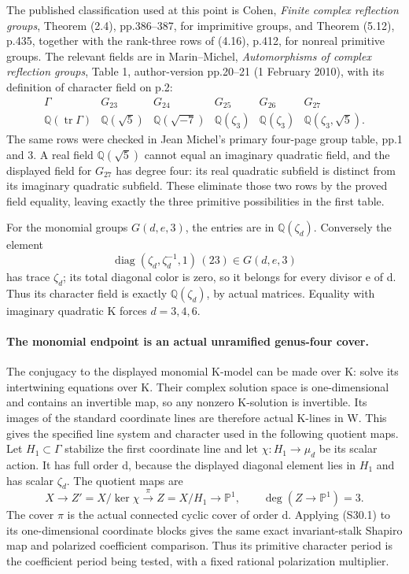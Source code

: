 The published classification used at this point is Cohen,
\emph{Finite complex reflection groups}, Theorem (2.4), pp.386--387,
for imprimitive groups, and Theorem (5.12), p.435, together with
the rank-three rows of (4.16), p.412, for nonreal primitive groups.
The relevant fields are in Marin--Michel, \emph{Automorphisms of
complex reflection groups}, Table 1, author-version pp.20--21
(1 February 2010), with its definition of character field on p.2:
\[
\begin{array}{c|ccccc}
\Gamma&G_{23}&G_{24}&G_{25}&G_{26}&G_{27}\\\hline
\mathbb Q(\operatorname{tr}\Gamma)&\mathbb Q(\sqrt5)&
\mathbb Q(\sqrt{-7})&\mathbb Q(\zeta_3)&
\mathbb Q(\zeta_3)&\mathbb Q(\zeta_3,\sqrt5).
\end{array}
\]
The same rows were checked in Jean Michel's primary four-page group
table, pp.1 and 3. A real field \(\mathbb Q(\sqrt5)\) cannot
equal an imaginary quadratic field, and the displayed field for
\(G_{27}\) has degree four: its real quadratic subfield is
distinct from its imaginary quadratic subfield. These eliminate
those two rows by the proved field equality, leaving exactly the
three primitive possibilities in the first table.

For the monomial groups \(G(d,e,3)\), the entries are in
\(\mathbb Q(\zeta_d)\). Conversely the element
\[
 \operatorname{diag}(\zeta_d,\zeta_d^{-1},1)\,(23)
                  \in G(d,e,3)
\]
has trace \(\zeta_d\); its total diagonal color is zero, so
it belongs for every divisor e of d. Thus its character field is
exactly \(\mathbb Q(\zeta_d)\), by actual matrices.
Equality with imaginary quadratic K forces \(d=3,4,6\).

\paragraph{The monomial endpoint is an actual unramified genus-four cover.}
The conjugacy to the displayed monomial K-model can be made over K:
solve its intertwining equations over K. Their complex solution space
is one-dimensional and contains an invertible map, so any nonzero
K-solution is invertible. Its images of the standard coordinate lines
are therefore actual K-lines in W. This gives the specified line
system and character used in the following quotient maps.
Let \(H_1\subset\Gamma\) stabilize the first coordinate line
and let \(\chi:H_1\to\mu_d\) be its scalar action. It has
full order d, because the displayed diagonal element lies in
\(H_1\) and has scalar \(\zeta_d\). The quotient maps are
\[
 X\longrightarrow Z'=X/\ker\chi
       \xrightarrow{\pi}Z=X/H_1\longrightarrow\mathbb P^1,
 \qquad \deg(Z\to\mathbb P^1)=3.
\]
The cover \(\pi\) is the actual connected cyclic cover of order
d. Applying (S30.1) to its one-dimensional coordinate blocks gives
the same exact invariant-stalk Shapiro map and polarized coefficient
comparison. Thus its primitive character period is the coefficient
period being tested, with a fixed rational polarization multiplier.

